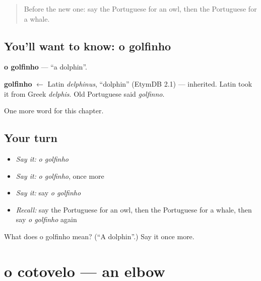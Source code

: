 \label{lesson:PT-C119-golfinho}



\begin{quote}
Before the new one: say the Portuguese for an owl, then the Portuguese for a whale.
\end{quote}

\subsection*{You'll want to know: o golfinho}
\textbf{o golfinho} — \textquotedblleft{}a dolphin\textquotedblright{}.

\begin{cousinweb}
\textbf{golfinho} $\leftarrow$ Latin \emph{delphinus}, \textquotedblleft{}dolphin\textquotedblright{} (EtymDB 2.1) — inherited. Latin took it from Greek \emph{delphis}. Old Portuguese said \emph{golfinno}.
\end{cousinweb}

\begin{grammarlens}[title={What you've built}]
One more word for this chapter.
\end{grammarlens}

\subsection*{Your turn}
\begin{itemize}
\raggedright
  \item \emph{Say it:} \emph{o golfinho}
  \item \emph{Say it:} \emph{o golfinho}, once more
  \item \emph{Say it:} say \emph{o golfinho}
  \item \emph{Recall:} say the Portuguese for an owl, then the Portuguese for a whale, then say \emph{o golfinho} again
\end{itemize}

\begin{tcolorbox}[breakable,colback=teal!4,colframe=teal!35!black,title={Before you move on}]
What does o golfinho mean? (\textquotedblleft{}A dolphin\textquotedblright{}.) Say it once more.
\end{tcolorbox}
\section[o cotovelo]{o cotovelo — an elbow}

\label{lesson:PT-C119-cotovelo}



